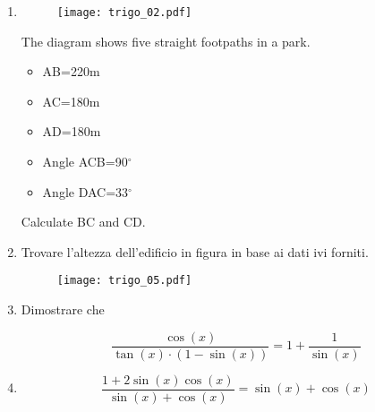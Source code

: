 \begin{enumerate} %

\item 

\begin{figure}[H]
\centering
\texttt{[image: trigo\_02.pdf]}
\end{figure}

The diagram shows five straight footpaths in a park.

\begin{itemize}
\item AB=220m
\item AC=180m
\item AD=180m
\item Angle ACB=90$^\circ$
\item Angle DAC=33$^\circ$
\end{itemize}

Calculate BC and CD.



\item 

Trovare l'altezza dell'edificio in figura in base ai dati ivi forniti.

\begin{figure}[H]
\centering
\texttt{[image: trigo\_05.pdf]}
\end{figure}


\item 

Dimostrare che 

\begin{equation*}
\frac{
\cos(x)
}{
\tan(x)\cdot\left(1-\sin(x)\right)
} = 1+\frac{1}{\sin(x)}
\end{equation*}

\item 

\begin{equation*}
\frac{
1+2\sin(x)\cos(x)
}{
\sin(x)+\cos(x)
}
=
\sin(x)+\cos(x)
\end{equation*}

\end{enumerate} %


